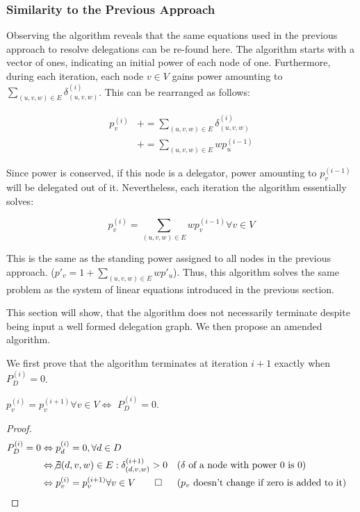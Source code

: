 \subsubsection{Similarity to the Previous Approach}

Observing the algorithm reveals that the same equations used in the previous approach to resolve delegations can be re-found here. The algorithm starts with a vector of ones, indicating an initial power of each node of one. Furthermore, during each iteration, each node $v \in V$ gains power amounting to $\sum_{(u, v, w) \in E} \delta^{(i)}_{(u, v, w)}$. This can be rearranged as follows:

\begin{align*}
p_v^{(i)} &+= \sum_{(u, v, w) \in E} \delta^{(i)}_{(u, v, w)} \\
&+= \sum_{(u, v, w) \in E} wp_u^{(i-1)}
\end{align*}

Since power is conserved, if this node is a delegator, power amounting to $p_v^{(i-1)}$ will be delegated out of it. Nevertheless, each iteration the algorithm essentially solves: 

\[
p_v^{(i)} = \sum_{(u, v, w) \in E} wp_v^{(i-1)} \forall v \in V
\]

This is the same as the standing power assigned to all nodes in the previous approach. ($p'_v = 1 + \sum_{(u, v, w) \in E} wp'_u$). Thus, this algorithm solves the same problem as the system of linear equations introduced in the previous section. 

This section will show, that the algorithm does not necessarily terminate despite being input a well formed delegation graph. We then propose an amended algorithm.

We first prove that the algorithm terminates at iteration $i+1$ exactly when $P_D^{(i)} = 0$.

\begin{lemma}\label{lem:simple_alg_terminates}
 $p_v^{(i)} = p_v^{(i+1)} \forall v \in V \Leftrightarrow$ $P_D^{(i)} = 0$.
\end{lemma}
\begin{proof}

\begin{align*}
	P_D^{(i)} = 0 
	&\Leftrightarrow p_d^{(i)} = 0, \forall d \in D \\
	&\Leftrightarrow \not\exists (d, v, w) \in E: \delta_{(d, v, w)}^{(i+1)} > 0  &&\text{($\delta$ of a node with power 0 is 0)}\\
	&\Leftrightarrow p_v^{(i)} = p_v^{(i+1)} \forall v \in V \qed  &&\text{($p_v$ doesn't change if zero is added to it)}
\end{align*}
\end{proof}

